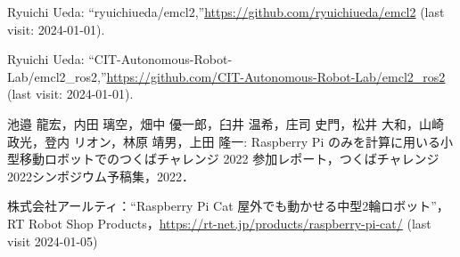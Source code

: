 \documentclass[twocolumn,9pt]{jsproceedings}
\begin{document}
\begin{thebibliography}{99}

  Ryuichi Ueda: ``ryuichiueda/emcl2,''\url{https://github.com/ryuichiueda/emcl2} (last visit: 2024-01-01).

  Ryuichi Ueda: ``CIT-Autonomous-Robot-Lab/emcl2\_ros2,''\url{https://github.com/CIT-Autonomous-Robot-Lab/emcl2_ros2} (last visit: 2024-01-01).






  池邉 龍宏，内田 璃空，畑中 優一郎，臼井 温希，庄司 史門，松井 大和，山崎 政光，登内 リオン，林原 靖男，上田 隆一: Raspberry Pi のみを計算に用いる小型移動ロボットでのつくばチャレンジ 2022 参加レポート，つくばチャレンジ2022シンポジウム予稿集，2022．




  株式会社アールティ：``Raspberry Pi Cat 屋外でも動かせる中型2輪ロボット''，
  RT Robot Shop Products，\url{https://rt-net.jp/products/raspberry-pi-cat/} (last visit 2024-01-05)


\end{thebibliography}
\end{document}
